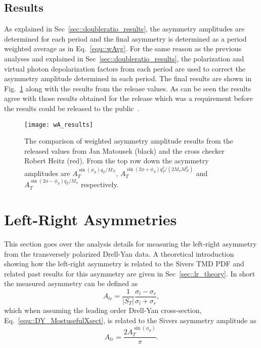 \subsection{Results}
As explained in Sec~\ref{sec::doubleratio_results}, the asymmetry amplitudes are
determined for each period and the final asymmetry is determined as a period
weighted average as in Eq.~\ref{equ::wAvg}.  For the same reason as the previous
analyses and explained in Sec~\ref{sec::doubleratio_results}, the polarization
and virtual photon depolarization factors from each period are used to correct
the asymmetry amplitude determined in each period.  The final results are shown
in Fig.~\ref{fig::wA_results} along with the results from the release values.
As can be seen the results agree with those results obtained for the release
which was a requirement before the results could be released to the
public~\cite{Matousek:2018qqd}.

\begin{figure}[h!t]
  \centering \texttt{[image: wA\_results]}
  \caption{The comparison of weighted asymmetry amplitude results from the
    released values from Jan Matousek (black) and the cross checker Robert Heitz
    (red).  From the top row down the asymmetry amplitudes are
    $A_T^{\sin(\phi_S) q_T/M_N}$, $A_T^{\sin(2\phi+\phi_S)
      q^3_T/(2M_{\pi}M_N^2)}$ and $A_T^{\sin(2\phi-\phi_S) q_T/M_{\pi}}$
    respectively.}
  \label{fig::wA_results}
\end{figure}


\section{Left-Right Asymmetries} \label{sec::leftrightasym}

This section goes over the analysis details for measuring the left-right
asymmetry from the transversely polarized Drell-Yan data.  A theoretical
introduction showing how the left-right asymmetry is related to the Sivers TMD
PDF and related past results for this asymmetry are given in
Sec~\ref{sec::lr_theory}.  In short the measured asymmetry can be defined as
\begin{equation}
  A_{lr} = \frac{1}{|S_T|}
  \frac{\sigma_l - \sigma_r}{\sigma_l +
    \sigma_r},
\end{equation}
\noindent
which when assuming the leading order Drell-Yan cross-section,
Eq.~\ref{equ::DY_MostusefulXsect}, is related to the Sivers asymmetry amplitude
as
\begin{equation}
  A_{lr} = \frac{2A_T^{\sin(\phi_S)}}{\pi}.
\end{equation}

